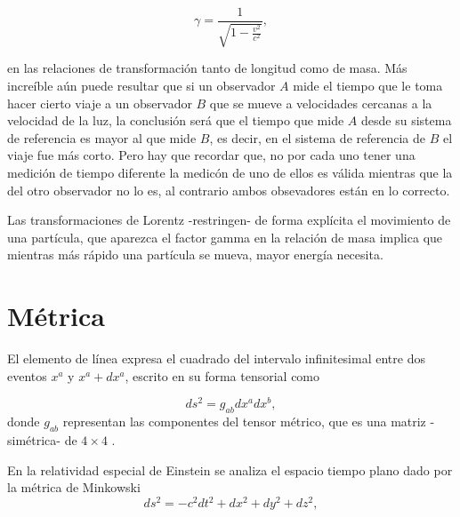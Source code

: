 \documentclass[11pt]{book}
\begin{document}
\begin{equation}
\gamma=\frac{1}{\sqrt{1-\frac{v^2}{c^2}}} ,
\label{fgamma}
\end{equation}



en las relaciones de transformación tanto de longitud como de masa. Más increíble aún puede resultar %
que si un observador $A$ mide el tiempo que le toma hacer cierto viaje a un observador $B$ que se mueve a velocidades cercanas a la velocidad de la luz, la conclusión será que el tiempo que mide $A$ desde su sistema de referencia es mayor al que mide $B$, es decir, en el sistema de referencia de $B$ el viaje fue más corto. Pero hay que recordar que, no por cada uno tener una medición  de tiempo diferente la medicón de uno de ellos es válida mientras que la del otro observador no lo es, al contrario ambos obsevadores están en lo correcto. 

Las transformaciones de Lorentz -restringen- de forma explícita el movimiento de una partícula, que aparezca el factor gamma en la relación de masa implica que mientras más rápido una partícula se mueva, mayor energía necesita.

\section{Métrica}

El elemento de línea expresa el cuadrado del intervalo infinitesimal entre dos eventos $x^a$ y $x^a+dx^a$, escrito en su forma tensorial como

\begin{equation}
ds^2=g_{ab}dx^adx^b ,
\label{linea}
\end{equation}
donde $g_{ab}$ representan las componentes del tensor métrico, que es una matriz -simétrica- de $4 \times 4$ .

En la relatividad especial de Einstein se analiza el espacio tiempo plano dado por la métrica de Minkowski 
\begin{equation}
ds^2=-c^2dt^2+dx^2+dy^2+dz^2 ,
\label{minkowski}
\end{equation}
\end{document}

